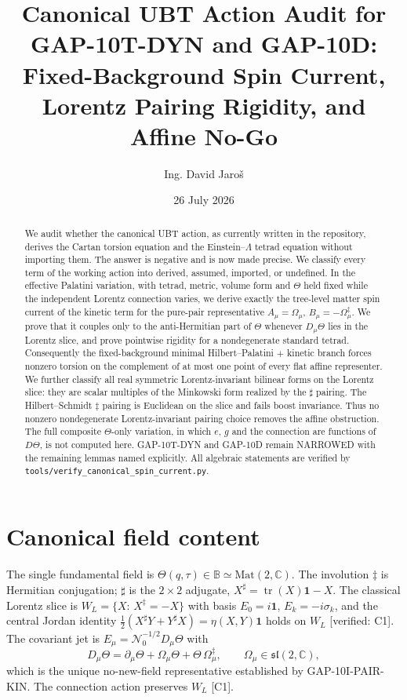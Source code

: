 \documentclass[11pt,a4paper]{article}
\title{Canonical UBT Action Audit for GAP-10T-DYN and GAP-10D:\\
Fixed-Background Spin Current, Lorentz Pairing Rigidity, and Affine No-Go}
\author{Ing. David Jaro\v{s}}
\date{26 July 2026}
\newcommand{\B}{\mathbb B}
\newcommand{\dd}{\ddagger}
\begin{document}
\maketitle

\begin{abstract}
We audit whether the canonical UBT action, as currently written in the
repository, derives the Cartan torsion equation and the
Einstein--$\Lambda$ tetrad equation without importing them.  The answer is
negative and is now made precise.  We classify every term of the working
action into derived, assumed, imported, or undefined.  In the effective
Palatini variation, with tetrad, metric, volume form and $\Theta$ held fixed
while the independent Lorentz connection varies, we derive exactly the
tree-level matter spin current of the kinetic term for the pure-pair
representative $A_\mu=\Omega_\mu$, $B_\mu=-\Omega_\mu^{\dd}$.  We prove that
it couples only to the anti-Hermitian part of $\Theta$ whenever
$D_\mu\Theta$ lies in the Lorentz slice, and prove pointwise rigidity for a
nondegenerate standard tetrad.  Consequently the fixed-background minimal
Hilbert--Palatini $+$ kinetic branch forces nonzero torsion on the complement
of at most one point of every flat affine representer.  We further classify
all real symmetric Lorentz-invariant bilinear forms on the Lorentz slice:
they are scalar multiples of the Minkowski form realized by the $\sharp$
pairing.  The Hilbert--Schmidt $\ddagger$ pairing is Euclidean on the slice
and fails boost invariance.  Thus no nonzero nondegenerate Lorentz-invariant
pairing choice removes the affine obstruction.  The full composite
$\Theta$-only variation, in which $e$, $g$ and the connection are functions
of $D\Theta$, is not computed here.  GAP-10T-DYN and GAP-10D remain NARROWED
with the remaining lemmas named explicitly.  All algebraic statements are
verified by \texttt{tools/verify\_canonical\_spin\_current.py}.
\end{abstract}

\section{Canonical field content}
The single fundamental field is $\Theta(q,\tau)\in\B\simeq\mathrm{Mat}(2,\mathbb C)$.
The involution $\dd$ is Hermitian conjugation; $\sharp$ is the $2\times2$
adjugate, $X^\sharp=\operatorname{tr}(X)\mathbf1-X$.  The classical Lorentz
slice is $W_L=\{X:\,X^{\dd}=-X\}$ with basis $E_0=i\mathbf1$,
$E_k=-i\sigma_k$, and the central Jordan identity
$\tfrac12(X^\sharp Y+Y^\sharp X)=\eta(X,Y)\mathbf1$ holds on $W_L$
[verified: C1].  The covariant jet is
$E_\mu=\mathcal N_0^{-1/2}D_\mu\Theta$ with
\begin{equation}
  D_\mu\Theta=\partial_\mu\Theta+\Omega_\mu\Theta+\Theta\,\Omega_\mu^{\dd},
  \qquad \Omega_\mu\in\mathfrak{sl}(2,\mathbb C),
  \label{eq:purepair}
\end{equation}
which is the unique no-new-field representative established by
GAP-10I-PAIR-KIN.  The connection action preserves $W_L$ [C1].
\end{document}
